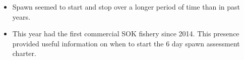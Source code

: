 \begin{itemize}

\item Spawn seemed to start and stop over a longer period of time than in past years.

\item This year had the first commercial SOK fishery since 2014.
This presence provided useful information on when to start the 6 day spawn assessment charter.

\end{itemize}